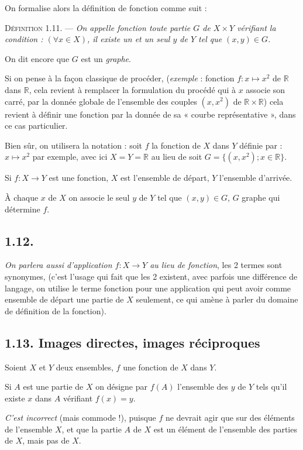 On formalise alors la définition de fonction comme suit :

\medskip\noindent\textsc{Définition 1.11.} --- \emph{On appelle fonction toute partie $G$ de $X\times Y$ vérifiant la condition : $(\forall x\in X)$, il existe un et un seul $y$ de $Y$ tel que $(x,y)\in G$.}

On dit encore que $G$ est un \emph{graphe}.

Si on pense à la façon classique de procéder, (\emph{exemple} : fonction $f:x\mapsto x^2$ de $\mathbb R$ dans $\mathbb R$, cela revient à remplacer la formulation du procédé qui à $x$ associe son carré, par la donnée globale de l'ensemble des couples $(x,x^2)$ de $\mathbb R\times\mathbb R$) cela revient à définir une fonction par la donnée de sa « courbe représentative », dans ce cas particulier.

Bien sûr, on utilisera la notation : soit $f$ la fonction de $X$ dans $Y$ définie par : $x\mapsto x^2$ par exemple, avec ici $X=Y=\mathbb R$ au lieu de soit $G=\{(x,x^2);x\in\mathbb R\}$.

Si $f:X\to Y$ est une fonction, $X$ est l'ensemble de départ, $Y$ l'ensemble d'arrivée.

À chaque $x$ de $X$ on associe le seul $y$ de $Y$ tel que $(x,y)\in G$, $G$ graphe qui détermine $f$.

\subsection*{1.12.}
\emph{On parlera aussi d'application $f:X\longrightarrow Y$ au lieu de fonction}, les 2 termes sont synonymes, (c'est l'usage qui fait que les 2 existent, avec parfois une différence de langage, on utilise le terme fonction pour une application qui peut avoir comme ensemble de départ une partie de $X$ seulement, ce qui amène à parler du domaine de définition de la fonction).

\subsection*{1.13. Images directes, images réciproques}

Soient $X$ et $Y$ deux ensembles, $f$ une fonction de $X$ dans $Y$.

Si $A$ est une partie de $X$ on désigne par $f(A)$ l'ensemble des $y$ de $Y$ tels qu'il existe $x$ dans $A$ vérifiant $f(x)=y$.

\emph{C'est incorrect} (mais commode !), puisque $f$ ne devrait agir que sur des éléments de l'ensemble $X$, et que la partie $A$ de $X$ est un élément de l'ensemble des parties de $X$, mais pas de $X$.

